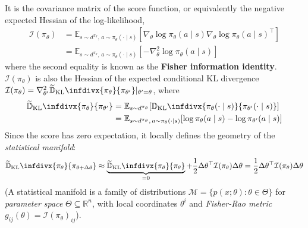 \documentclass[11pt, letterpaper]{article}
\newcommand{\KL}{\mathbb{D}_{\text{KL}}\infdivx}
\newcommand{\TKL}{\widetilde{\mathbb{D}}_{\text{KL}}\infdivx}
\begin{document}
\begin{concept}
    It is the covariance matrix of the score function, or equivalently the negative expected Hessian of the log-likelihood, 
    \begin{align*}
        \mathcal{I}(\pi_\theta) 
        &= \mathbb{E}_{s \sim d^{\pi_\theta},\, a \sim \pi_\theta(\cdot \mid s)} \left[\nabla_\theta \log \pi_\theta(a \mid s) \nabla_\theta \log \pi_\theta(a \mid s)^\top \right] \\
        &= \mathbb{E}_{s \sim d^{\pi_\theta},\, a \sim \pi_\theta(\cdot \mid s)} \left[-\nabla_\theta^2 \log \pi_\theta(a \mid s)\right]
    \end{align*}
    where the second equality is known as the \textbf{Fisher information identity}. \(\mathcal{I}(\pi_\theta)\) is also the Hessian of the expected conditional KL divergence \(\mathcal{I}(\pi_\theta) = \nabla_{\theta'}^2 \TKL{\pi_\theta}{\pi_{\theta'}} \rvert_{\theta' = \theta}\), where
    \begin{align*}
        \TKL{\pi_\theta}{\pi_{\theta'}} 
        &= \mathbb{E}_{s \sim d^{\pi_\theta}}[\KL{\pi_\theta(\cdot \mid s)}{\pi_{\theta'}(\cdot \mid s)} ] \\
        &= \mathbb{E}_{s \sim d^{\pi_\theta},\, a \sim \pi_\theta(\cdot \mid s)} [\log \pi_\theta(a \mid s) - \log \pi_{\theta'}(a \mid s)]
    \end{align*}
    Since the score has zero expectation, it locally defines the geometry of the \textit{statistical manifold}: 
    \[
        \TKL{\pi_\theta}{\pi_{\theta + \Delta\theta}} 
        \approx \underbrace{\TKL{\pi_\theta}{\pi_{\theta}}}_{=0} + \frac{1}{2}\Delta\theta^\top \mathcal{I}(\pi_\theta) \Delta\theta
        = \frac{1}{2}\Delta\theta^\top \mathcal{I}(\pi_\theta) \Delta\theta
    \]
    (A statistical manifold is a family of distributions \(\mathcal{M} = \{p(x; \theta) : \theta \in \Theta \}\) for \textit{parameter space} \(\Theta \subseteq \mathbb{R}^n\), with local coordinates \(\theta^i\) and \textit{Fisher-Rao metric} \(g_{ij}(\theta) = \mathcal{I}(\pi_\theta)_{ij}\)). 
\end{concept}
\end{document}
